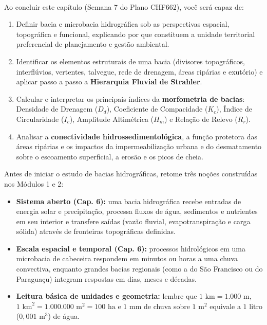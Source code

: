 \noindent\tagEmenta\ \tagPratica
\par\vspace{6pt}

\begin{capObjetivos}
Ao concluir este capítulo (Semana 7 do Plano CHF662), você será capaz de:
\begin{enumerate}[leftmargin=1.6em, itemsep=2pt]
  \item Definir bacia e microbacia hidrográfica sob as perspectivas espacial, topográfica e funcional, explicando por que constituem a unidade territorial preferencial de planejamento e gestão ambiental.
  \item Identificar os elementos estruturais de uma bacia (divisores topográficos, interflúvios, vertentes, talvegue, rede de drenagem, áreas ripárias e exutório) e aplicar passo a passo a \textbf{Hierarquia Fluvial de Strahler}.
  \item Calcular e interpretar os principais índices da \textbf{morfometria de bacias}: Densidade de Drenagem ($D_d$), Coeficiente de Compacidade ($K_c$), Índice de Circularidade ($I_c$), Amplitude Altimétrica ($H_m$) e Relação de Relevo ($R_r$).
  \item Analisar a \textbf{conectividade hidrossedimentológica}, a função protetora das áreas ripárias e os impactos da impermeabilização urbana e do desmatamento sobre o escoamento superficial, a erosão e os picos de cheia.
\end{enumerate}
\end{capObjetivos}

\begin{capRevisao}
Antes de iniciar o estudo de bacias hidrográficas, retome três noções construídas nos Módulos 1 e 2:
\begin{itemize}[leftmargin=1.5em, itemsep=2pt]
  \item \textbf{Sistema aberto (Cap. 6):} uma bacia hidrográfica recebe entradas de energia solar e precipitação, processa fluxos de água, sedimentos e nutrientes em seu interior e transfere saídas (vazão fluvial, evapotranspiração e carga sólida) através de fronteiras topográficas definidas.
  \item \textbf{Escala espacial e temporal (Cap. 6):} processos hidrológicos em uma microbacia de cabeceira respondem em minutos ou horas a uma chuva convectiva, enquanto grandes bacias regionais (como a do São Francisco ou do Paraguaçu) integram respostas em dias, meses e décadas.
  \item \textbf{Leitura básica de unidades e geometria:} lembre que $1\text{ km} = 1.000\text{ m}$, $1\text{ km}^2 = 1.000.000\text{ m}^2 = 100\text{ ha}$ e $1\text{ mm}$ de chuva sobre $1\text{ m}^2$ equivale a $1\text{ litro}$ ($0{,}001\text{ m}^3$) de água.
\end{itemize}
\end{capRevisao}

